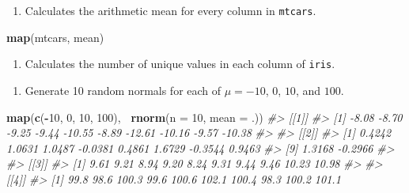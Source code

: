 \documentclass[]{book}
\newenvironment{Shaded}{\begin{snugshade}}{\end{snugshade}}
\newcommand{\CommentTok}[1]{\textcolor[rgb]{0.56,0.35,0.01}{\textit{#1}}}
\newcommand{\DataTypeTok}[1]{\textcolor[rgb]{0.13,0.29,0.53}{#1}}
\newcommand{\DecValTok}[1]{\textcolor[rgb]{0.00,0.00,0.81}{#1}}
\newcommand{\KeywordTok}[1]{\textcolor[rgb]{0.13,0.29,0.53}{\textbf{#1}}}
\newcommand{\NormalTok}[1]{#1}
\newcommand{\OperatorTok}[1]{\textcolor[rgb]{0.81,0.36,0.00}{\textbf{#1}}}
\newcommand{\StringTok}[1]{\textcolor[rgb]{0.31,0.60,0.02}{#1}}
\providecommand{\tightlist}{%
  \setlength{\itemsep}{0pt}\setlength{\parskip}{0pt}}
\begin{document}
\begin{enumerate}
\def\labelenumi{\arabic{enumi}.}
\tightlist
\item
  Calculates the arithmetic mean for every column in \texttt{mtcars}.
\end{enumerate}

\begin{Shaded}
\begin{Highlighting}[]
\KeywordTok{map}\NormalTok{(mtcars, mean)}
\end{Highlighting}
\end{Shaded}

\begin{enumerate}
\def\labelenumi{\arabic{enumi}.}
\setcounter{enumi}{1}
\tightlist
\item
  Calculates the number of unique values in each column of \texttt{iris}.
\end{enumerate}

\begin{Shaded}
\end{Shaded}

\begin{enumerate}
\def\labelenumi{\arabic{enumi}.}
\setcounter{enumi}{2}
\tightlist
\item
  Generate 10 random normals for each of \(\mu = -10\), \(0\), \(10\), and \(100\).
\end{enumerate}

\begin{Shaded}
\begin{Highlighting}[]
\KeywordTok{map}\NormalTok{(}\KeywordTok{c}\NormalTok{(}\OperatorTok{-}\DecValTok{10}\NormalTok{, }\DecValTok{0}\NormalTok{, }\DecValTok{10}\NormalTok{, }\DecValTok{100}\NormalTok{), }\OperatorTok{~}\KeywordTok{rnorm}\NormalTok{(}\DataTypeTok{n =} \DecValTok{10}\NormalTok{, }\DataTypeTok{mean =}\NormalTok{ .))}
\CommentTok{#> [[1]]}
\CommentTok{#>  [1]  -8.08  -8.70  -9.25  -9.44 -10.55  -8.89 -12.61 -10.16  -9.57 -10.38}
\CommentTok{#> }
\CommentTok{#> [[2]]}
\CommentTok{#>  [1]  0.4242  1.0631  1.0487 -0.0381  0.4861  1.6729 -0.3544  0.9463}
\CommentTok{#>  [9]  1.3168 -0.2966}
\CommentTok{#> }
\CommentTok{#> [[3]]}
\CommentTok{#>  [1]  9.61  9.21  8.94  9.20  8.24  9.31  9.44  9.46 10.23 10.98}
\CommentTok{#> }
\CommentTok{#> [[4]]}
\CommentTok{#>  [1]  99.8  98.6 100.3  99.6 100.6 102.1 100.4  98.3 100.2 101.1}
\end{Highlighting}
\end{Shaded}
\end{document}
